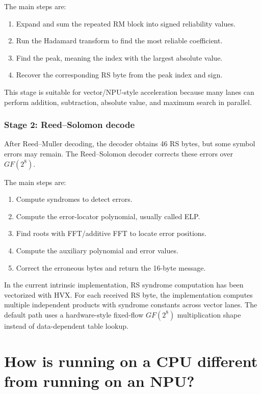 \documentclass[12pt,a4paper]{article}
\begin{document}
The main steps are:

\begin{enumerate}
    \item Expand and sum the repeated RM block into signed reliability values.
    \item Run the Hadamard transform to find the most reliable coefficient.
    \item Find the peak, meaning the index with the largest absolute value.
    \item Recover the corresponding RS byte from the peak index and sign.
\end{enumerate}

This stage is suitable for vector/NPU-style acceleration because many lanes can perform addition, subtraction, absolute value, and maximum search in parallel.

\subsubsection*{Stage 2: Reed--Solomon decode}

After Reed--Muller decoding, the decoder obtains 46 RS bytes, but some symbol errors may remain. The Reed--Solomon decoder corrects these errors over $GF(2^8)$.

The main steps are:

\begin{enumerate}
    \item Compute syndromes to detect errors.
    \item Compute the error-locator polynomial, usually called ELP.
    \item Find roots with FFT/additive FFT to locate error positions.
    \item Compute the auxiliary polynomial and error values.
    \item Correct the erroneous bytes and return the 16-byte message.
\end{enumerate}

In the current intrinsic implementation, RS syndrome computation has been vectorized with HVX. For each received RS byte, the implementation computes multiple independent products with syndrome constants across vector lanes. The default path uses a hardware-style fixed-flow $GF(2^8)$ multiplication shape instead of data-dependent table lookup.

\section{How is running on a CPU different from running on an NPU?}
\end{document}
